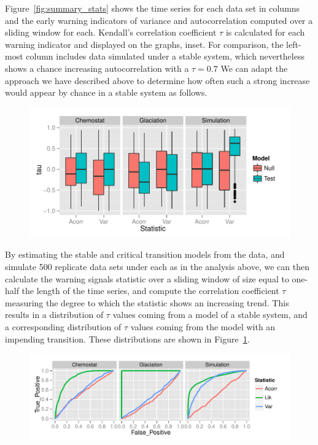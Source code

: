 \documentclass[authoryear,review,11pt]{elsarticle}
\begin{document}
Figure~\ref{fig:summary_stats} shows the time series for each data set in columns 
and the early warning indicators  of variance and autocorrelation 
computed over a sliding window for each.  
Kendall's correlation coefficient $\tau$ is calculated for each warning indicator and displayed on the graphs, inset.  
For comparison, the left-most column includes data simulated under a stable system, 
which nevertheless shows a chance increasing autocorrelation with a $\tau=0.7$
We can adapt the approach we have described above to determine how often such a strong increase would appear 
by chance in a stable system as follows.  

 \begin{figure}
   \begin{center}
     \includegraphics[width=\linewidth]{figures/summary_box.pdf}
     \caption{}
     \label{fig:summary_box}
  \end{center}
 \end{figure}



By estimating the stable and critical transition models from the data,
and simulate 500 replicate data sets under each as in the analysis above,
we can then calculate the warning signals statistic over a sliding window 
of size equal to one-half the length of the time series,
and compute the correlation coefficient $\tau$ measuring the degree to which the statistic shows an increasing trend.   
This results in a distribution of $\tau$ values coming from a model of a stable system, 
and a corresponding distribution of $\tau$ values coming from the model with an impending transition.  
These distributions are shown in Figure~\ref{fig:summary_box}.  



 \begin{figure}
   \begin{center}
     \includegraphics[width=\linewidth]{figures/summary_roc.pdf}
     \caption{}
     \label{fig:summary_roc}
  \end{center}
 \end{figure}
\end{document}

